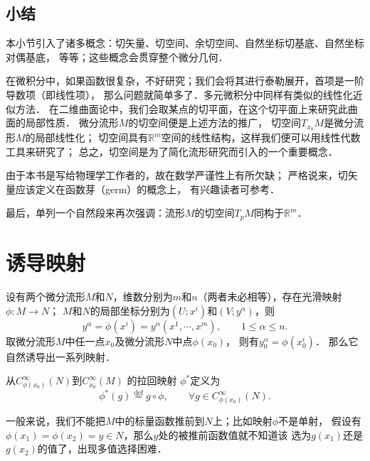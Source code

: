 \subsection*{小结}
本小节引入了诸多概念：切矢量、切空间、余切空间、自然坐标切基底、自然坐标对偶基底，
等等；这些概念会贯穿整个微分几何．

在微积分中，如果函数很复杂，不好研究；我们会将其进行泰勒展开，首项是一阶导数项（即线性项），
那么问题就简单多了．多元微积分中同样有类似的线性化近似方法．
在二维曲面论中，我们会取某点的切平面，在这个切平面上来研究此曲面的局部性质．
微分流形$M$的切空间便是上述方法的推广，
切空间$T_{x_0}M$是微分流形$M$的局部线性化；
切空间具有$\mathbb{R}^m$空间的线性结构，这样我们便可以用线性代数工具来研究了；
总之，切空间是为了简化流形研究而引入的一个重要概念．



由于本书是写给物理学工作者的，故在数学严谨性上有所欠缺；
严格说来，切矢量应该定义在函数芽（germ）的概念上，
有兴趣读者可参考\parencite[\S 1.2]{cc2001-zh}．

最后，单列一个自然段来再次强调：流形$M$的切空间$T_pM$同构于$\mathbb{R}^m$．





\section{诱导映射}\label{chdm:sec_induced-map}
设有两个微分流形$M$和$N$，维数分别为$m$和$n$（两者未必相等），存在光滑映射$\phi:M\to N$；
$M$和$N$的局部坐标分别为$(U;x^i)$和$(V;y^\alpha)$，则
\begin{equation}
    y^\alpha = \phi(x^i)=y^\alpha (x^1,\cdots, x^m), \qquad 1\leqslant \alpha \leqslant n .
\end{equation}
取微分流形$M$中任一点$x_0$及微分流形$N$中点$\phi(x_0)$，
则有$y^\alpha_0=\phi(x^i_0)$．
那么它自然诱导出一系列映射．
\begin{definition}\label{chdm:def_pullback-scalar}
    从$C^\infty_{\phi(x_0)}(N)$到$C^\infty_{x_0}(M)$
    的{\heiti 拉回映射} $\phi^{*}$定义为
    \begin{equation}
        \phi^{*}(g) \overset{\mathrm {def}}{=} g \circ \phi, 
        \qquad \forall g\in C^\infty_{\phi(x_0)}(N) .
    \end{equation}
\end{definition}
一般来说，我们不能把$M$中的标量函数推前到$N$上；比如映射$\phi$不是单射，
假设有$\phi(x_1)=\phi(x_2)=y\in N$，那么$y$处的被推前函数值就不知道该
选为$g(x_1)$还是$g(x_2)$的值了，出现多值选择困难．

